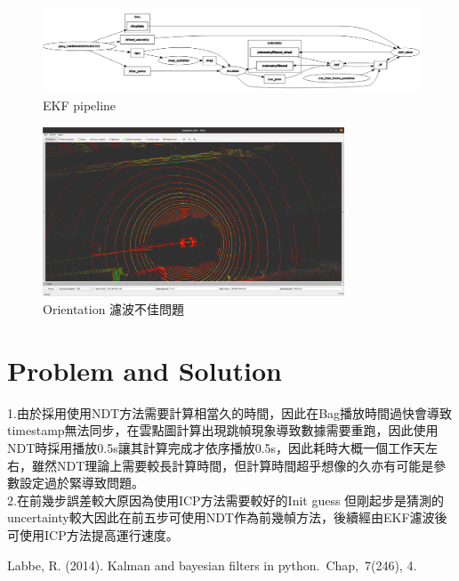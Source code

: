 \documentclass{article}
\begin{document}
\begin{figure}[H]
\centering
	\includegraphics[width=1.0\textwidth]{./ekf_data.png}
	\caption{EKF pipeline}
\end{figure}

\begin{figure}[H]
\centering
	\includegraphics[width=0.8\textwidth]{./ekf_orientation.png}
	\caption{Orientation 濾波不佳問題}
\end{figure}
\section{Problem and Solution}
1.由於採用使用NDT方法需要計算相當久的時間，因此在Bag播放時間過快會導致timestamp無法同步，在雲點圖計算出現跳幀現象導致數據需要重跑，因此使用NDT時採用播放0.5s讓其計算完成才依序播放0.5s，因此耗時大概一個工作天左右，雖然NDT理論上需要較長計算時間，但計算時間超乎想像的久亦有可能是參數設定過於緊導致問題。\\
2.在前幾步誤差較大原因為使用ICP方法需要較好的Init guess 但剛起步是猜測的uncertainty較大因此在前五步可使用NDT作為前幾幀方法，後續經由EKF濾波後可使用ICP方法提高運行速度。
\begin{thebibliography}{1}
 
    Labbe, R. (2014). Kalman and bayesian filters in python. Chap, 7(246), 4.
\end{thebibliography}
\end{document}
